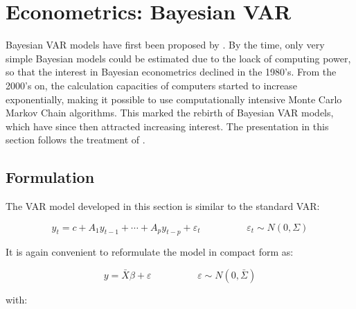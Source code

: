 \section{Econometrics: Bayesian VAR}
\label{chapter3_section5}


Bayesian VAR models have first been proposed by \cite{Doan1984}. By the time, only very simple Bayesian models could be estimated due to the loack of computing power, so that the interest in Bayesian econometrics declined in the 1980's. From the 2000's on, the calculation capacities of computers started to increase exponentially, making it possible to use computationally intensive Monte Carlo Markov Chain algorithms. This marked the rebirth of Bayesian VAR models, which have since then attracted increasing interest. The presentation in this section follows the treatment of \cite{Karlsson2012}.


\subsection{Formulation}
\label{chapter3_section5_subsection1}


The VAR model developed in this section is similar to the standard VAR:

\begin{equation}
y_t = c + A_1 y_{t-1} + \cdots + A_p y_{t-p} + \varepsilon_t \hspace{2cm}
\varepsilon_t \sim N(0, \Sigma)
\label{equation_c3_s5_ss1_1}
\end{equation}

It is again convenient to reformulate the model in compact form as:

\begin{equation}
y = \bar{X} \beta + \varepsilon \hspace{2cm}
\varepsilon \sim N(0, \bar{\Sigma})
\label{equation_c3_s5_ss1_2}
\end{equation}

with:

